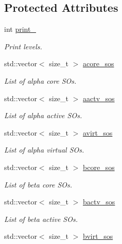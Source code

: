 \subsection*{Protected Attributes}
\begin{DoxyCompactItemize}
\item 
int \mbox{\hyperlink{classforte_1_1_m_r_d_s_r_g___s_o_a53a06becec13b9694da588610292e60b}{print\+\_\+}}
\begin{DoxyCompactList}\small\item\em Print levels. \end{DoxyCompactList}\item 
std\+::vector$<$ size\+\_\+t $>$ \mbox{\hyperlink{classforte_1_1_m_r_d_s_r_g___s_o_ad43e1addcb08dd50b0eb6a869f831488}{acore\+\_\+sos}}
\begin{DoxyCompactList}\small\item\em List of alpha core S\+Os. \end{DoxyCompactList}\item 
std\+::vector$<$ size\+\_\+t $>$ \mbox{\hyperlink{classforte_1_1_m_r_d_s_r_g___s_o_ac17f47bc2bb1e1f429442678939dba7c}{aactv\+\_\+sos}}
\begin{DoxyCompactList}\small\item\em List of alpha active S\+Os. \end{DoxyCompactList}\item 
std\+::vector$<$ size\+\_\+t $>$ \mbox{\hyperlink{classforte_1_1_m_r_d_s_r_g___s_o_a3a15bd158e9431e1baf2714a84cec7da}{avirt\+\_\+sos}}
\begin{DoxyCompactList}\small\item\em List of alpha virtual S\+Os. \end{DoxyCompactList}\item 
std\+::vector$<$ size\+\_\+t $>$ \mbox{\hyperlink{classforte_1_1_m_r_d_s_r_g___s_o_a695c522af96ad0c0c9f68c152784dc9d}{bcore\+\_\+sos}}
\begin{DoxyCompactList}\small\item\em List of beta core S\+Os. \end{DoxyCompactList}\item 
std\+::vector$<$ size\+\_\+t $>$ \mbox{\hyperlink{classforte_1_1_m_r_d_s_r_g___s_o_a2355deb624e18e593d405152486335bd}{bactv\+\_\+sos}}
\begin{DoxyCompactList}\small\item\em List of beta active S\+Os. \end{DoxyCompactList}\item 
std\+::vector$<$ size\+\_\+t $>$ \mbox{\hyperlink{classforte_1_1_m_r_d_s_r_g___s_o_a0c19e492b238f91b2481f93160c65dbe}{bvirt\+\_\+sos}}

\end{DoxyCompactItemize}
